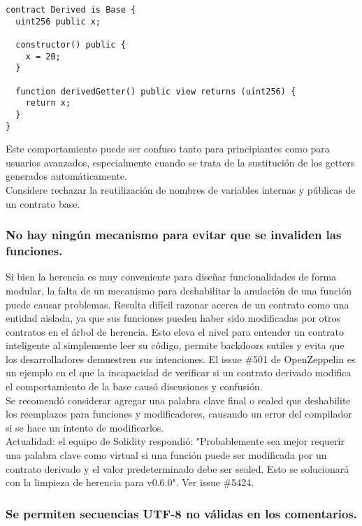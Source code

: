 \begin{lstlisting}[language=Solidity]
contract Derived is Base {
  uint256 public x;

  constructor() public {
    x = 20;
  }

  function derivedGetter() public view returns (uint256) {
    return x;
  }
}
\end{lstlisting}

Este comportamiento puede ser confuso tanto para principiantes como para usuarios avanzados, especialmente cuando se trata de la sustitución de los getters generados automáticamente.\\

Considere rechazar la reutilización de nombres de variables internas y públicas de un contrato base.

\subsubsection{No hay ningún mecanismo para evitar que se invaliden las funciones.}

Si bien la herencia es muy conveniente para diseñar funcionalidades de forma modular, la falta de un mecanismo para deshabilitar la anulación de una función puede causar problemas. Resulta difícil razonar acerca de un contrato como una entidad aislada, ya que sus funciones pueden haber sido modificadas por otros contratos en el árbol de herencia. Esto eleva el nivel para entender un contrato inteligente al simplemente leer su código, permite backdoors sutiles y evita que los desarrolladores demuestren sus intenciones. El issue \#501 de OpenZeppelin es un ejemplo en el que la incapacidad de verificar si un contrato derivado modifica el comportamiento de la base causó discusiones y confusión.\\

Se recomendó considerar agregar una palabra clave final o sealed que deshabilite los reemplazos para funciones y modificadores, causando un error del compilador si se hace un intento de modificarlos.\\

Actualidad: el equipo de Solidity respondió: "Probablemente sea mejor requerir una palabra clave como virtual si una función puede ser modificada por un contrato derivado y el valor predeterminado debe ser sealed. Esto se solucionará con la limpieza de herencia para v0.6.0". Ver issue \#5424.

\subsubsection{Se permiten secuencias UTF-8 no válidas en los comentarios.}

